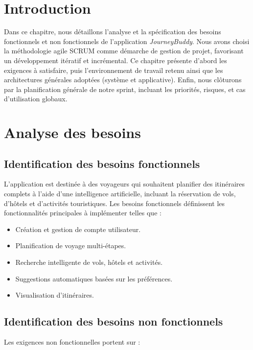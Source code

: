 \section{Introduction}

Dans ce chapitre, nous détaillons l’analyse et la spécification des besoins fonctionnels et non fonctionnels de l’application \textit{JourneyBuddy}.  
Nous avons choisi la méthodologie agile SCRUM comme démarche de gestion de projet, favorisant un développement itératif et incrémental.  
Ce chapitre présente d'abord les exigences à satisfaire, puis l’environnement de travail retenu ainsi que les architectures générales adoptées (système et applicative).  
Enfin, nous clôturons par la planification générale de notre sprint, incluant les priorités, risques, et cas d’utilisation globaux.

\section{Analyse des besoins}

\subsection{Identification des besoins fonctionnels}

L’application est destinée à des voyageurs qui souhaitent planifier des itinéraires complets à l’aide d’une intelligence artificielle, incluant la réservation de vols, d’hôtels et d’activités touristiques.  
Les besoins fonctionnels définissent les fonctionnalités principales à implémenter telles que :

\begin{itemize}
    \item Création et gestion de compte utilisateur.
    \item Planification de voyage multi-étapes.
    \item Recherche intelligente de vols, hôtels et activités.
    \item Suggestions automatiques basées sur les préférences.
    \item Visualisation d’itinéraires.
\end{itemize}

\subsection{Identification des besoins non fonctionnels}

Les exigences non fonctionnelles portent sur :


